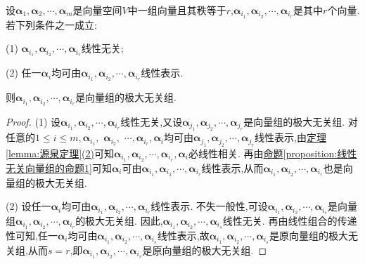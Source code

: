 \documentclass[../../main.tex]{subfiles}%
\begin{document}
\begin{proposition}\label{proposition:极大无关组的判定条件}
设\(\boldsymbol{\alpha}_1,\boldsymbol{\alpha}_2,\cdots,\boldsymbol{\alpha}_m\)是向量空间\(V\)中一组向量且其秩等于\(r\),\(\boldsymbol{\alpha}_{i_1},\boldsymbol{\alpha}_{i_2},\cdots,\boldsymbol{\alpha}_{i_r}\)是其中\(r\)个向量. 若下列条件之一成立:

(1) \(\boldsymbol{\alpha}_{i_1},\boldsymbol{\alpha}_{i_2},\cdots,\boldsymbol{\alpha}_{i_r}\)线性无关;

(2) 任一\(\boldsymbol{\alpha}_i\)均可由\(\boldsymbol{\alpha}_{i_1},\boldsymbol{\alpha}_{i_2},\cdots,\boldsymbol{\alpha}_{i_r}\)线性表示.

则\(\boldsymbol{\alpha}_{i_1},\boldsymbol{\alpha}_{i_2},\cdots,\boldsymbol{\alpha}_{i_r}\)是向量组的极大无关组.
\end{proposition}
\begin{proof}
(1) 设\(\boldsymbol{\alpha}_{i_1},\boldsymbol{\alpha}_{i_2},\cdots,\boldsymbol{\alpha}_{i_r}\)线性无关,又设\(\boldsymbol{\alpha}_{j_1},\boldsymbol{\alpha}_{j_2},\cdots,\boldsymbol{\alpha}_{j_r}\)是向量组的极大无关组. 对任意的\(1\leqslant  i\leqslant  m,\)$\boldsymbol{\alpha}_{i_1},$ $\boldsymbol{\alpha}_{i_2},$ $\cdots,$$\boldsymbol{\alpha}_{i_r},$$\boldsymbol{\alpha}_i$均可由\(\boldsymbol{\alpha}_{j_1},\boldsymbol{\alpha}_{j_2},\cdots,\boldsymbol{\alpha}_{j_r}\)线性表示,由\hyperref[lemma:源泉定理]{定理\ref{lemma:源泉定理}(2)}可知\(\boldsymbol{\alpha}_{i_1},\boldsymbol{\alpha}_{i_2},\cdots,\boldsymbol{\alpha}_{i_r},\boldsymbol{\alpha}_i\)必线性相关. 再由\hyperref[proposition:线性无关向量组的命题1]{命题\ref{proposition:线性无关向量组的命题1}}可知\(\boldsymbol{\alpha}_i\)可由\(\boldsymbol{\alpha}_{i_1},\boldsymbol{\alpha}_{i_2},\cdots,\boldsymbol{\alpha}_{i_r}\)线性表示,从而\(\boldsymbol{\alpha}_{i_1},\boldsymbol{\alpha}_{i_2},\cdots,\boldsymbol{\alpha}_{i_r}\)也是向量组的极大无关组.

(2) 设任一\(\boldsymbol{\alpha}_i\)均可由\(\boldsymbol{\alpha}_{i_1},\boldsymbol{\alpha}_{i_2},\cdots,\boldsymbol{\alpha}_{i_r}\)线性表示. 不失一般性,可设\(\boldsymbol{\alpha}_{i_1},\boldsymbol{\alpha}_{i_2},\cdots,\boldsymbol{\alpha}_{i_s}\)是向量组\(\boldsymbol{\alpha}_{i_1},\boldsymbol{\alpha}_{i_2},\cdots,\boldsymbol{\alpha}_{i_r}\)的极大无关组. 因此,\(\boldsymbol{\alpha}_{i_1},\boldsymbol{\alpha}_{i_2},\cdots,\boldsymbol{\alpha}_{i_s}\)线性无关. 再由线性组合的传递性可知,任一\(\boldsymbol{\alpha}_i\)均可由\(\boldsymbol{\alpha}_{i_1},\boldsymbol{\alpha}_{i_2},\cdots,\boldsymbol{\alpha}_{i_s}\)线性表示,故\(\boldsymbol{\alpha}_{i_1},\boldsymbol{\alpha}_{i_2},\cdots,\boldsymbol{\alpha}_{i_s}\)是原向量组的极大无关组,从而\(s = r\),即\(\boldsymbol{\alpha}_{i_1},\boldsymbol{\alpha}_{i_2},\cdots,\boldsymbol{\alpha}_{i_r}\)是原向量组的极大无关组.
\end{proof}
\end{document}
